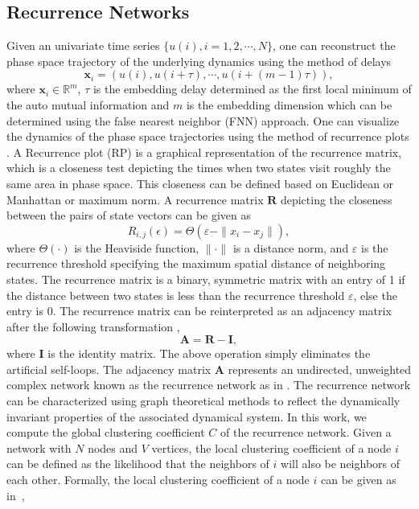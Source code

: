 \documentclass[letterpaper, 9pt, conference]{ieeeconf}
\begin{document}
\subsection{Recurrence Networks}
Given an univariate time series $\{u(i) , i = 1,2, \cdots ,N \}$, one can reconstruct the phase space trajectory of the underlying dynamics using the method of delays \cite{takens1981detecting}
\begin{equation}
\mathbf{x}_{i} = (u(i),u(i+\tau),\cdots,u(i+(m-1)\tau)),
\end{equation}
where $\mathbf{x}_{i} \in \mathbb{R}^m$, $\tau$ is the embedding delay determined as the first local minimum of the auto mutual information and $m$ is the embedding dimension which can be determined using the false nearest neighbor (FNN) approach. One can visualize the dynamics of the phase space trajectories using the method of recurrence plots \cite{eckmann1987recurrence}. A Recurrence plot (RP) is a graphical representation of the recurrence matrix, which is a closeness test depicting the times when two states visit roughly the same area in phase space. This closeness can be defined based on Euclidean or Manhattan or maximum norm. A recurrence matrix $\mathbf{R}$ depicting the closeness between the pairs of state vectors can be given as \cite{marwan2009complex,donner2010recurrence}
\begin{equation}
R_{i,j}(\epsilon)=\Theta(\varepsilon - \| x_{i}-x_{j}\|),
\end{equation}
where $\Theta(\cdot)$ is the Heaviside function, $\|\cdot\|$ is a distance norm, and $\varepsilon $ is the recurrence threshold specifying the maximum spatial distance of neighboring states. The recurrence matrix is a binary, symmetric matrix with an entry of 1 if the distance between two states is less than the recurrence threshold $\varepsilon$, else the entry is 0. The recurrence matrix can be reinterpreted as an adjacency matrix after the following transformation \cite{marwan2009complex,donner2010recurrence},
\begin{equation}
\mathbf{A} = \mathbf{R}-\mathbf{I},
\end{equation}
where $\mathbf{I}$ is the identity matrix. The above operation simply eliminates the artificial self-loops. The adjacency matrix $\mathbf{A}$ represents an undirected, unweighted complex network known as the recurrence network as in \cite{donner2010recurrence}. 
The recurrence network can be characterized using graph theoretical methods to reflect the dynamically invariant properties of the associated dynamical system. In this work, we compute the global clustering coefficient $C$ of the recurrence network. Given a network with $N$ nodes and $V$ vertices, the local clustering coefficient of a node $i$ can be defined as the likelihood that the neighbors of $i$ will also be neighbors of each other. Formally, the local clustering coefficient of a node $i$ can be given as in~\cite{watts1998collective},
\end{document}
